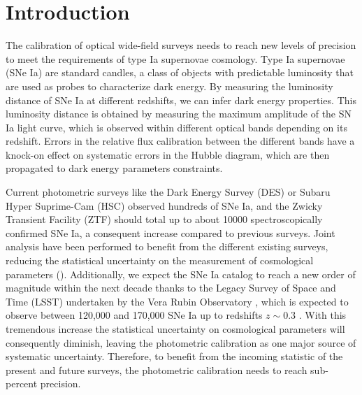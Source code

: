 \section{Introduction}

The calibration of optical wide-field surveys needs to reach new levels of precision to meet the requirements of type Ia supernovae cosmology. Type Ia supernovae (SNe Ia) are standard candles, a class of objects with predictable luminosity that are used as probes to characterize dark energy. By measuring the luminosity distance of SNe Ia at different redshifts, we can infer dark energy properties. This luminosity distance is obtained by measuring the maximum amplitude of the SN Ia light curve, which is observed within different optical bands depending on its redshift. Errors in the relative flux calibration between the different bands have a knock-on effect on systematic errors in the Hubble diagram, which are then propagated to dark energy parameters constraints.

Current photometric surveys like the Dark Energy Survey (DES) \citep{Brout_2019} or Subaru Hyper Suprime-Cam (HSC) \citep{hsc_2019} observed hundreds of SNe Ia, and the Zwicky Transient Facility (ZTF) \citep{ztf_2022} should total up to about \num{10000} spectroscopically confirmed SNe Ia, a consequent increase compared to previous surveys. Joint analysis have been performed to benefit from the different existing surveys, 
reducing the statistical uncertainty on the measurement of cosmological parameters (\citealt{Betoule_2014,Scolnic_2018,Brout_2022,rubin2023union}). Additionally, we expect the SNe Ia catalog to reach a new order of magnitude within the next decade thanks to the Legacy Survey of Space and Time (LSST) undertaken by the Vera Rubin Observatory \citep{lsst}, which is expected to observe between 120,000 and 170,000 SNe Ia up to redshifts $z \sim 0.3$ \citep{lsst_2022}. With this tremendous increase the statistical uncertainty on cosmological parameters will consequently diminish, leaving the photometric calibration as one major source of systematic uncertainty. Therefore, to benefit from the incoming statistic of the present and future surveys, the photometric calibration needs to reach sub-percent precision.

